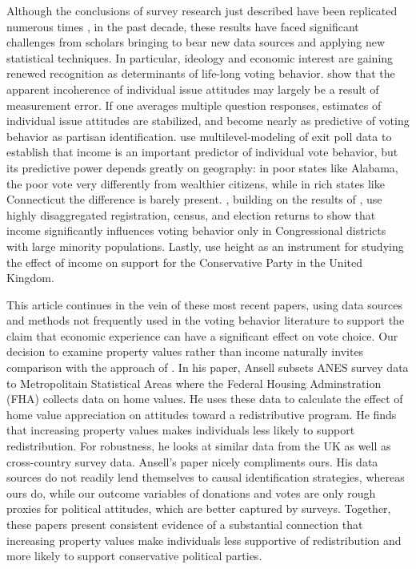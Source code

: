 Although the conclusions of survey research just described have been replicated numerous times \parencite{Nie1976,Smith989,LewisBeck2008}, in the past decade, these results have faced significant challenges from scholars bringing to bear new data sources and applying new statistical techniques. In particular, ideology and economic interest are gaining renewed recognition as determinants of life-long voting behavior. \textcite{Ansolabehere2008} show that the apparent incoherence of individual issue attitudes may largely be a result of measurement error. If one averages multiple question responses, estimates of individual issue attitudes are stabilized, and become nearly as predictive of voting behavior as partisan identification. \textcite{Gelman2007} use multilevel-modeling of exit poll data to establish that income is an important predictor of individual vote behavior, but its predictive power depends greatly on geography: in poor states like Alabama, the poor vote very differently from wealthier citizens, while in rich states like Connecticut the difference is barely present. \textcite{Hersh2015}, building on the results of \textcite{Gelman2007}, use highly disaggregated registration, census, and election returns to show that income significantly influences voting behavior only in Congressional districts with large minority populations. Lastly, \citeauthor{Arunchalam} use height as an instrument for studying the effect of income on support for the Conservative Party in the United Kingdom. 

This article continues in the vein of these most recent papers, using data sources and methods not frequently used in the voting behavior literature to support the claim that economic experience can have a significant effect on vote choice. Our decision to examine property values rather than income naturally invites comparison with the approach of \textcite{Ansell2014}. In his paper, Ansell subsets ANES survey data to Metropolitain Statistical Areas where the Federal Housing Adminstration (FHA) collects data on home values. He uses these data to calculate the effect of home value appreciation on attitudes toward a redistributive program. He finds that increasing property values makes individuals less likely to support redistribution. For robustness, he looks at similar data from the UK as well as cross-country survey data. Ansell's paper nicely compliments ours. His data sources do not readily lend themselves to causal identification strategies, whereas ours do, while our outcome variables of donations and votes are only rough proxies for political attitudes, which are better captured by surveys. Together, these papers present consistent evidence of a substantial connection that increasing property values make individuals less supportive of redistribution and more likely to support conservative political parties. 

